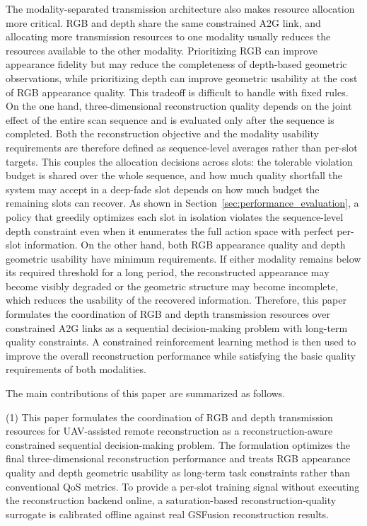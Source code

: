 \documentclass[journal]{IEEEtran}
\begin{document}
The modality-separated transmission architecture also makes resource allocation more critical. RGB and depth share the same constrained A2G link, and allocating more transmission resources to one modality usually reduces the resources available to the other modality. Prioritizing RGB can improve appearance fidelity but may reduce the completeness of depth-based geometric observations, while prioritizing depth can improve geometric usability at the cost of RGB appearance quality. This tradeoff is difficult to handle with fixed rules. On the one hand, three-dimensional reconstruction quality depends on the joint effect of the entire scan sequence and is evaluated only after the sequence is completed. Both the reconstruction objective and the modality usability requirements are therefore defined as sequence-level averages rather than per-slot targets. This couples the allocation decisions across slots: the tolerable violation budget is shared over the whole sequence, and how much quality shortfall the system may accept in a deep-fade slot depends on how much budget the remaining slots can recover. As shown in Section~\ref{sec:performance_evaluation}, a policy that greedily optimizes each slot in isolation violates the sequence-level depth constraint even when it enumerates the full action space with perfect per-slot information. On the other hand, both RGB appearance quality and depth geometric usability have minimum requirements. If either modality remains below its required threshold for a long period, the reconstructed appearance may become visibly degraded or the geometric structure may become incomplete, which reduces the usability of the recovered information. Therefore, this paper formulates the coordination of RGB and depth transmission resources over constrained A2G links as a sequential decision-making problem with long-term quality constraints. A constrained reinforcement learning method is then used to improve the overall reconstruction performance while satisfying the basic quality requirements of both modalities.

The main contributions of this paper are summarized as follows.

\noindent(1) This paper formulates the coordination of RGB and depth transmission resources for UAV-assisted remote reconstruction as a reconstruction-aware constrained sequential decision-making problem. The formulation optimizes the final three-dimensional reconstruction performance and treats RGB appearance quality and depth geometric usability as long-term task constraints rather than conventional QoS metrics. To provide a per-slot training signal without executing the reconstruction backend online, a saturation-based reconstruction-quality surrogate is calibrated offline against real GSFusion reconstruction results.
\end{document}
